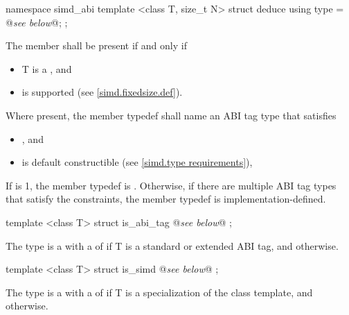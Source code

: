 \begin{itemdecl}
namespace simd_abi {
  template <class T, size_t N> struct deduce { using type = @\emph{see below}@; };
}
\end{itemdecl}
\begin{itemdescr}
  \pnum The member  shall be present if and only if
  \begin{itemize}
    \item \type T is a \realArithmeticType{}, and
    \item \fixedsizeN is supported (see \ref{simd.fixedsize.def}).
  \end{itemize}

  \pnum Where present, the member typedef  shall name an ABI tag type that satisfies
  \begin{itemize}
    \item {}, and
    \item \simd[<T, type>] is default constructible (see \ref{simd.type requirements}),
  \end{itemize}

  If  is 1, the member typedef  is .
  Otherwise, if there are multiple ABI tag types that satisfy the constraints, the member typedef  is implementation-defined.

  \pnum{}
\end{itemdescr}

\begin{itemdecl}
template <class T> struct is_abi_tag { @\emph{see below}@ };
\end{itemdecl}
\begin{itemdescr}
  \pnum The type  is a \UnaryTypeTrait with a \BaseCharacteristic of  if \type T is a standard or extended ABI tag, and  otherwise.

  \pnum{}
\end{itemdescr}

\begin{itemdecl}
template <class T> struct is_simd { @\emph{see below}@ };
\end{itemdecl}
\begin{itemdescr}
  \pnum The type  is a \UnaryTypeTrait with a \BaseCharacteristic of  if \type T is a specialization of the \simd class template, and  otherwise.

  \pnum{}
\end{itemdescr}


